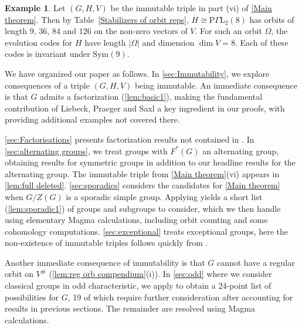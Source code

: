\documentclass[12pt]{amsart}
\theoremstyle{remark}
\theoremstyle{notation}
\theoremstyle{definition}
\newtheorem{example}[theorem]{Example}
\newcommand{\0}{\emptyset}
\newcommand{\Sym}{\mathrm{Sym}}
\begin{document}
\begin{example} Let $(G,H,V)$ be the immutable triple in part (vi) of \cref{Main theorem}. Then by Table~\ref{Stabilizers of orbit reps}, $H\cong \mathrm P\Gamma\mathrm L_2(8)$ has orbits of length $9$, $36$, $84$ and $126$ on the non-zero vectors of $V$. For such an orbit $\Omega$,  the evolution  codes for $H$ have length $|\Omega|$ and dimension $\dim V=8$.  Each of these codes is invariant under $\Sym(9)$.
\end{example}







We have organized our paper as follows. In \cref{sec:Immutability}, we explore consequences of a triple $(G,H,V)$ being immutable.
An immediate consequence is that $G$ admits a factorization (\cref{lem:basic1}), making the fundamental contribution of Liebeck, Praeger and Saxl \cite{LiebeckPraegerSaxl} a key ingredient in our proofs, with \cite{GGS} providing additional examples not covered there.

\cref{sec:Factorisations} presents factorization results not contained in \cite{LiebeckPraegerSaxl,GGS}.
In \cref{sec:alternating groups}, we treat groups with $F^*(G)$ an alternating group, obtaining results for symmetric groups in addition to our headline results for the alternating group.  The immutable triple from \cref{Main theorem}(vi) appears in \cref{lem:full deleted}.
\cref{sec:sporadics} considers the candidates for \cref{Main theorem} when $G/Z(G)$ is a sporadic simple group.
Applying \cite{LiebeckPraegerSaxl} yields a short list (\cref{lem:sporadic1}) of groups and subgroups to consider, which we then handle using elementary {\sc Magma} \cite{Magma} calculations, including orbit counting and some cohomology computations.
\cref{sec:exceptional} treats exceptional groups, here the non-existence of immutable triples follows quickly from \cite{LiebeckPraegerSaxl}.

Another immediate consequence of immutability is that $G$ cannot have a regular orbit on $V ^\#$ (\cref{lem:reg orb compendium}(i)).
In \cref{sec:odd} where we consider classical groups in odd characteristic, we apply \cite{Lee1} to obtain a 24-point list of possibilities for $G$, 19 of which require further consideration after accounting for results in previous sections.
The remainder are resolved using {\sc Magma} calculations.
\end{document}
